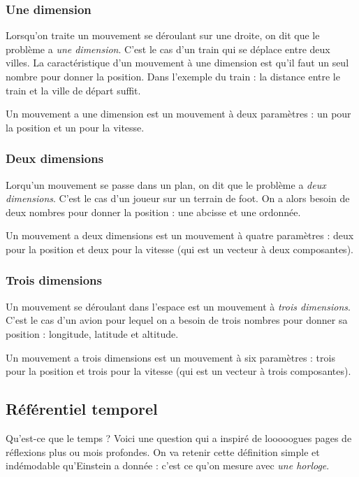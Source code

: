 \subsubsection{Une dimension} Lorsqu'on traite un mouvement se déroulant sur une droite, on dit que le problème a \emph{une dimension}. C'est le cas  d'un train qui se déplace entre deux villes. La caractéristique d'un mouvement à une dimension est qu'il faut un seul nombre pour donner la position. Dans l'exemple du train : la distance entre le train et la ville de départ suffit.

Un mouvement a une dimension est un mouvement à deux paramètres : un pour la position et un pour la vitesse.

\subsubsection{Deux dimensions} Lorqu'un mouvement se passe dans un plan, on dit que le problème a \emph{deux dimensions}. C'est le cas d'un joueur sur un terrain de foot. On a alors besoin de deux nombres pour donner la position : une abcisse et une ordonnée. 

Un mouvement a deux dimensions est un mouvement à quatre paramètres : deux pour la position et deux pour la vitesse (qui est un vecteur à deux composantes).

\subsubsection{Trois dimensions} Un mouvement se déroulant dans l'espace est un mouvement à \emph{trois dimensions}. C'est le cas d'un avion pour lequel on a besoin de trois nombres pour donner sa position : longitude, latitude et altitude.

Un mouvement a trois dimensions est un mouvement à six paramètres : trois pour la position et trois pour la vitesse (qui est un vecteur à trois composantes).

\subsection{Référentiel temporel}

Qu'est-ce que le temps ? Voici une question qui a inspiré de looooogues pages de réflexions plus ou mois profondes. On va retenir cette définition simple et indémodable qu'Einstein a donnée :  c'est ce qu'on mesure avec \emph{une horloge}. 

